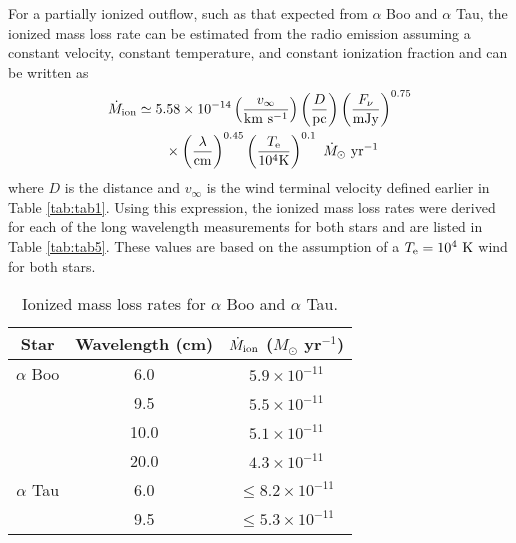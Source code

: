 For a partially ionized outflow, such as that expected from $\alpha$ Boo and $\alpha$ Tau, the ionized mass loss rate can be estimated from the radio emission assuming a constant velocity, constant temperature, and constant ionization fraction and can be written as  
\begin{align}
\dot{M}_{\rm{ion}} & \simeq 5.58 \times 10^{-14} \left(\frac{v_{\infty}}{\rm{km \  s^{-1}}}\right) \left(\frac{D}{\rm{pc}}\right)\left( \frac{F_{\nu}}{\rm{mJy}} \right)^{0.75} \nonumber \\
 & \qquad \times \left( \frac{\lambda}{\rm{cm}} \right)^{0.45} \left( \frac{T_{\rm{e}}}{10^4 \rm{K}} \right)^{0.1} \ \dot{M}_{\odot} \ \rm{yr}^{-1} 
\label{eq:5}
\end{align}
where $D$ is the distance and $v_{\infty}$ is the wind terminal velocity defined earlier in Table \ref{tab:tab1}. Using this expression, the ionized mass loss rates were derived for each of the long wavelength measurements for both stars and are listed in Table \ref{tab:tab5}. These values are based on the assumption of a $T_{\rm{e}} = 10^4 \ \rm{K}$  wind for both stars. 


\begin{table}[!hb]
\begin{center}
\caption[Ionized mass loss rates for $\alpha$ Boo and $\alpha$ Tau.]
{Ionized mass loss rates for $\alpha$ Boo and $\alpha$ Tau.}
\begin{tabular}{ccc}
\hline
\hline
\rule{0pt}{2.5ex}Star & Wavelength (cm) & $\dot{M} _{\rm{ion}}$ ($M _{\odot}$ yr$^{-1}$) \\
\hline
$\alpha$ Boo				& 6.0  & $5.9 \times 10^{-11}$ \\
							& 9.5  & $5.5 \times 10^{-11}$ \\
							& 10.0  & $5.1 \times 10^{-11}$ \\
							& 20.0  & $4.3 \times 10^{-11}$ \\
$\alpha$ Tau				& 6.0  & $\leq 8.2 \times 10^{-11}$ \\
							& 9.5 & $\leq 5.3 \times 10^{-11}$ \\
\hline
\end{tabular}
\label{tab:6.xxx}
\end{center}
\end{table}

